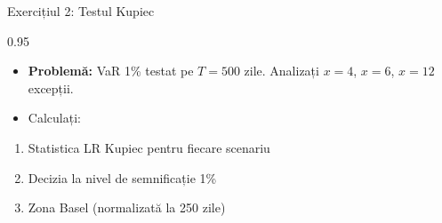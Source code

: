 \documentclass[9pt, aspectratio=169, t]{beamer}
\begin{document}
\begin{frame}{Exercițiul 2: Testul Kupiec}
    \begin{cminipage}{0.95\textwidth}
    \begin{itemize}\setlength{\itemsep}{0pt}
        \item \textbf{Problemă:} VaR 1\% testat pe $T = 500$ zile. Analizați $x = 4$, $x = 6$, $x = 12$ excepții.
    \end{itemize}

    \begin{itemize}\setlength{\itemsep}{0pt}
        \item Calculați:
    \end{itemize}
    \begin{enumerate}\setlength{\itemsep}{0pt}
        \item Statistica LR Kupiec pentru fiecare scenariu
        \item Decizia la nivel de semnificație 1\%
        \item Zona Basel (normalizată la 250 zile)
    \end{enumerate}
    \end{cminipage}
\end{frame}
\end{document}
